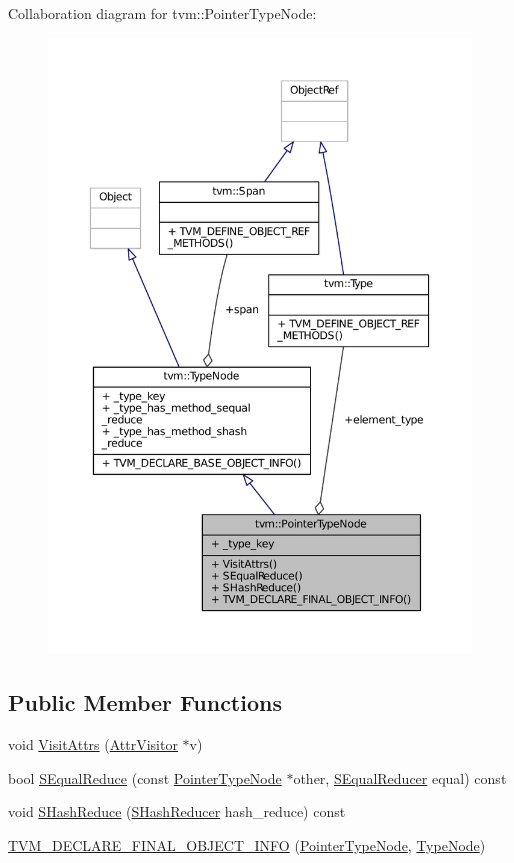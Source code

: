 Collaboration diagram for tvm\+:\+:Pointer\+Type\+Node\+:
\nopagebreak
\begin{figure}[H]
\begin{center}
\leavevmode
\includegraphics[width=350pt]{classtvm_1_1PointerTypeNode__coll__graph}
\end{center}
\end{figure}
\subsection*{Public Member Functions}
\begin{DoxyCompactItemize}
\item 
void \hyperlink{classtvm_1_1PointerTypeNode_a4a940fe740d0a1f019e4e94c30d4d916}{Visit\+Attrs} (\hyperlink{classtvm_1_1AttrVisitor}{Attr\+Visitor} $\ast$v)
\item 
bool \hyperlink{classtvm_1_1PointerTypeNode_a376830f7df4aaf0168eadf03c56b58a2}{S\+Equal\+Reduce} (const \hyperlink{classtvm_1_1PointerTypeNode}{Pointer\+Type\+Node} $\ast$other, \hyperlink{classtvm_1_1SEqualReducer}{S\+Equal\+Reducer} equal) const 
\item 
void \hyperlink{classtvm_1_1PointerTypeNode_a36cf8709c3b50510af894bf57161ab75}{S\+Hash\+Reduce} (\hyperlink{classtvm_1_1SHashReducer}{S\+Hash\+Reducer} hash\+\_\+reduce) const 
\item 
\hyperlink{classtvm_1_1PointerTypeNode_a40ec5920802b3e2e287b60fd081c9025}{T\+V\+M\+\_\+\+D\+E\+C\+L\+A\+R\+E\+\_\+\+F\+I\+N\+A\+L\+\_\+\+O\+B\+J\+E\+C\+T\+\_\+\+I\+N\+FO} (\hyperlink{classtvm_1_1PointerTypeNode}{Pointer\+Type\+Node}, \hyperlink{classtvm_1_1TypeNode}{Type\+Node})
\end{DoxyCompactItemize}
